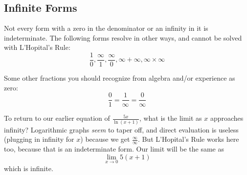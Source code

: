 \subsection{Infinite Forms}
Not every form with a zero in the denominator or an infinity in it is indeterminate.
The following forms resolve in other ways, and cannot be solved with L'Hopital's
Rule:
$$
\frac{1}{0} , \frac{\infty}{1} , \frac{\infty}{0} , \infty + \infty , \infty \times\infty
$$

Some other fractions you should recognize from algebra and/or experience as zero:
$$
\frac{0}{1} = \frac{1}{\infty} = \frac{0}{\infty}
$$

To return to our earlier equation of $\frac{5x}{\ln(x+1)}$, what is the limit as $x$ 
approaches infinity?  Logarithmic graphs \emph{seem} to taper off, and direct 
evaluation is useless (plugging in infinity for $x$) because we get $\frac{\infty}{\infty}$.
But L'Hopital's Rule works here too, because that is an indeterminate form.
Our limit will be the same as 
\begin{equation}
\lim_{x\rightarrow0}5(x+1)
\end{equation}
which is infinite.